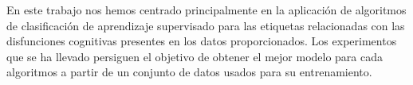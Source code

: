 En este trabajo nos hemos centrado principalmente en la aplicación de algoritmos de clasificación de aprendizaje supervisado para las etiquetas relacionadas con las disfunciones cognitivas presentes en los datos proporcionados. Los experimentos que se ha llevado persiguen el objetivo de obtener el mejor modelo para cada algoritmos a partir de un conjunto de datos usados para su entrenamiento.

